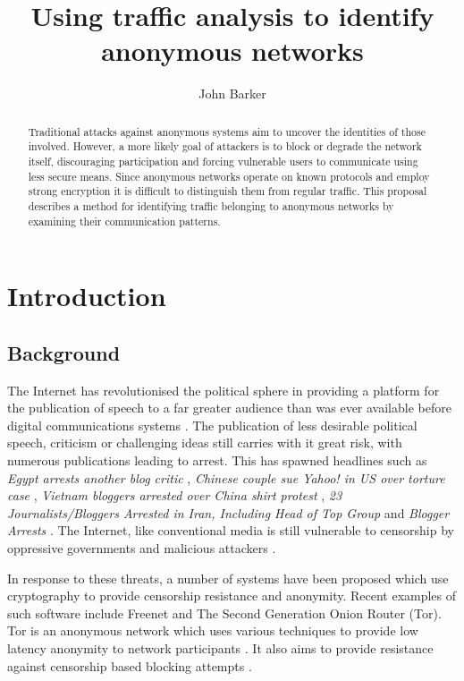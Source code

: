\documentclass{ecuthesis}
\title{Using traffic analysis to identify anonymous networks}
\author{John Barker}
\begin{document}
\maketitle

\begin{abstract}

Traditional attacks against anonymous systems aim to uncover the identities of those involved. However, a more likely goal of attackers is to block or degrade the network itself, discouraging participation and forcing vulnerable users to communicate using less secure means. Since anonymous networks operate on known protocols and employ strong encryption it is difficult to distinguish them from regular traffic. This proposal describes a method for identifying traffic belonging to anonymous networks by examining their communication patterns.

\end{abstract}

\chapter{Introduction}

\section{Background}

The Internet has revolutionised the political sphere in providing a platform for the publication of speech to a far greater audience than was ever available before digital communications systems \citep{Bonchek:1997p3455}. The publication of less desirable political speech, criticism or challenging ideas still carries with it great risk, with numerous publications leading to arrest. This has spawned headlines such as \emph{Egypt arrests another blog critic} \citeyear{website:egypt-arrests}, \emph{Chinese couple sue Yahoo! in US over torture case} \citep{website:china-yahoo-torture}, \emph{Vietnam bloggers arrested over China shirt protest} \citep{website:vietnam-bloggers-arrested}, \emph{23 Journalists/Bloggers Arrested in Iran, Including Head of Top Group} \citeyear{website:iran-bloggers-arrested} and \emph{Blogger Arrests} \citep{website:blogger-arrests}. The Internet, like conventional media is still vulnerable to censorship by oppressive governments and malicious attackers \citep{Crandall:2007p6165,Karlin:2009p6166}.

In response to these threats, a number of systems have been proposed which use cryptography to provide censorship resistance and anonymity. Recent examples of such software include Freenet \citep{Clarke:2001p2435} and The Second Generation Onion Router (Tor). Tor is an anonymous network which uses various techniques to provide low latency anonymity to network participants \citep{Dingledine:2004p314}. It also aims to provide resistance against censorship based blocking attempts \citep{Dingledine:2008p1542}.
\end{document}
